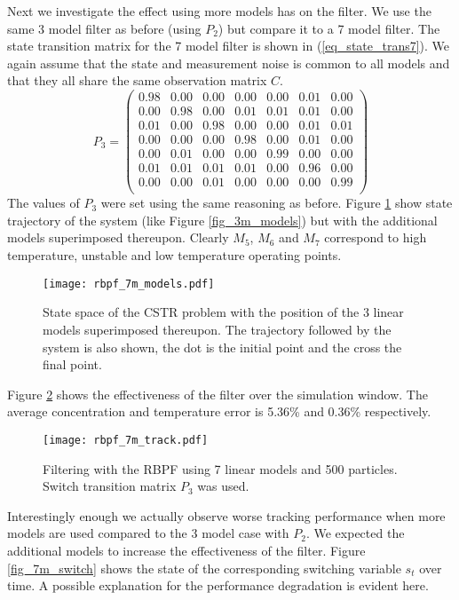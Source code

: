 Next we investigate the effect using more models has on the filter. We use the same 3 model filter as before (using $P_2$) but compare it to a 7 model filter. The state transition matrix for the 7 model filter is shown in (\ref{eq_state_trans7}). We again assume that the state and measurement noise is common to all models and that they all share the same observation  matrix $C$.
\begin{equation}
P_3 = \begin{pmatrix}
0.98 & 0.00 & 0.00 & 0.00 & 0.00 & 0.01 & 0.00 \\
0.00 & 0.98 & 0.00 & 0.01 & 0.01 & 0.01 & 0.00 \\
0.01 & 0.00 & 0.98 & 0.00 & 0.00 & 0.01 & 0.01 \\
0.00 & 0.00 & 0.00 & 0.98 & 0.00 & 0.01 & 0.00 \\
0.00 & 0.01 & 0.00 & 0.00 & 0.99 & 0.00 & 0.00 \\
0.01 & 0.01 & 0.01 & 0.01 & 0.00 & 0.96 & 0.00 \\
0.00 & 0.00 & 0.01 & 0.00 & 0.00 & 0.00 & 0.99 \\
\end{pmatrix}
\label{eq_state_trans7}
\end{equation}
The values of $P_3$ were set using the same reasoning as before. Figure \ref{fig_7m_models} show state trajectory of the system (like Figure \ref{fig_3m_models}) but with the additional models superimposed thereupon. Clearly $M_5$, $M_6$ and $M_7$ correspond to high temperature, unstable and low temperature operating points. 
\begin{figure}[H] 
\centering
\texttt{[image: rbpf\_7m\_models.pdf]}
\caption{State space of the CSTR problem with the position of the 3 linear models superimposed thereupon. The trajectory followed by the system is also shown, the dot is the initial point and the cross the final point.}
\label{fig_7m_models}
\end{figure}
Figure \ref{fig_7m_track} shows the effectiveness of the filter over the simulation window. The average concentration and temperature error is 5.36\% and 0.36\% respectively. 
\begin{figure}[H] 
\centering
\texttt{[image: rbpf\_7m\_track.pdf]}
\caption{Filtering with the RBPF using 7 linear models and 500 particles. Switch transition matrix $P_3$ was used.}
\label{fig_7m_track}
\end{figure}
Interestingly enough we actually observe worse tracking performance when more models are used compared to the 3 model case with $P_2$. We expected the additional models to increase the effectiveness of the filter. Figure \ref{fig_7m_switch} shows the state of the corresponding switching variable $s_t$ over time. A possible explanation for the performance degradation is evident here.
